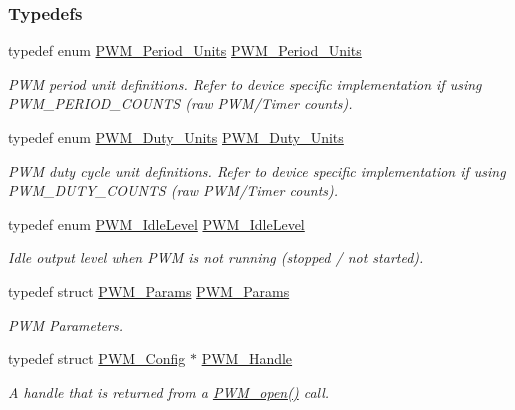 \subsubsection*{Typedefs}
\begin{DoxyCompactItemize}
\item 
typedef enum \hyperlink{_p_w_m_8h_a11aa442e82549992c98729216d64fd63}{P\+W\+M\+\_\+\+Period\+\_\+\+Units} \hyperlink{_p_w_m_8h_a662b819cdd93b4f2864ffe3bbadd0a03}{P\+W\+M\+\_\+\+Period\+\_\+\+Units}
\begin{DoxyCompactList}\small\item\em P\+W\+M period unit definitions. Refer to device specific implementation if using P\+W\+M\+\_\+\+P\+E\+R\+I\+O\+D\+\_\+\+C\+O\+U\+N\+T\+S (raw P\+W\+M/\+Timer counts). \end{DoxyCompactList}\item 
typedef enum \hyperlink{_p_w_m_8h_abc7bc5565f2767cf9f06c1572044a8ee}{P\+W\+M\+\_\+\+Duty\+\_\+\+Units} \hyperlink{_p_w_m_8h_a22bd075b8383527f3e5dcfb9e574f217}{P\+W\+M\+\_\+\+Duty\+\_\+\+Units}
\begin{DoxyCompactList}\small\item\em P\+W\+M duty cycle unit definitions. Refer to device specific implementation if using P\+W\+M\+\_\+\+D\+U\+T\+Y\+\_\+\+C\+O\+U\+N\+T\+S (raw P\+W\+M/\+Timer counts). \end{DoxyCompactList}\item 
typedef enum \hyperlink{_p_w_m_8h_a5a40c7014745d15b0c1a604dae5593f9}{P\+W\+M\+\_\+\+Idle\+Level} \hyperlink{_p_w_m_8h_a0584e30a7a05a2195d3ef8a9ba4a5609}{P\+W\+M\+\_\+\+Idle\+Level}
\begin{DoxyCompactList}\small\item\em Idle output level when P\+W\+M is not running (stopped / not started). \end{DoxyCompactList}\item 
typedef struct \hyperlink{struct_p_w_m___params}{P\+W\+M\+\_\+\+Params} \hyperlink{_p_w_m_8h_ac7349e4fc779fd744daf79b403269167}{P\+W\+M\+\_\+\+Params}
\begin{DoxyCompactList}\small\item\em P\+W\+M Parameters. \end{DoxyCompactList}\item 
typedef struct \hyperlink{struct_p_w_m___config}{P\+W\+M\+\_\+\+Config} $\ast$ \hyperlink{_p_w_m_8h_afdefc765f42bbad4dca246fda6e1354b}{P\+W\+M\+\_\+\+Handle}
\begin{DoxyCompactList}\small\item\em A handle that is returned from a \hyperlink{_p_w_m_8h_ac963beab0c5c6901bf852f175028aeaf}{P\+W\+M\+\_\+open()} call. \end{DoxyCompactList}\item 

\end{DoxyCompactItemize}
